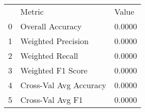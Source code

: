 \begin{tabular}{lll}
 & Metric & Value \\
0 & Overall Accuracy & 0.0000 \\
1 & Weighted Precision & 0.0000 \\
2 & Weighted Recall & 0.0000 \\
3 & Weighted F1 Score & 0.0000 \\
4 & Cross-Val Avg Accuracy & 0.0000 \\
5 & Cross-Val Avg F1 & 0.0000 \\
\end{tabular}
